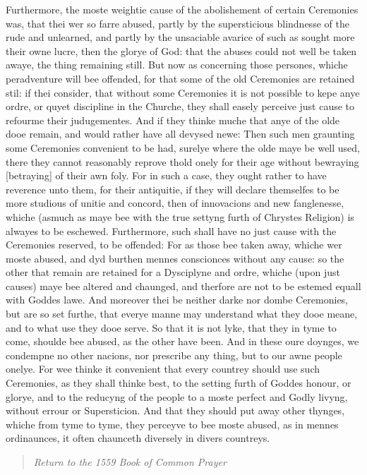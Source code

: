 Furthermore, the moste weightie cause of the abolishement
of certain Ceremonies was, that thei wer so farre abused, partly by
the supersticious blindnesse of the rude and unlearned, and partly by
the unsaciable avarice of such as sought more their owne lucre, then
the glorye of God: that the abuses could not well be taken awaye, the
thing remaining still. But now as concerning those persones, whiche
peradventure will bee offended, for that some of the old Ceremonies
are retained stil: if thei consider, that without some Ceremonies it
is not possible to kepe anye ordre, or quyet discipline in the Churche,
they shall easely perceive just cause to refourme their judugementes.
And if they thinke muche that anye of the olde dooe remain, and would
rather have all devysed newe: Then such men graunting some Ceremonies
convenient to be had, surelye where the olde maye be well used, there
they cannot reasonably reprove thold onely for their age without bewraying
[betraying] of their awn foly.
For in such a case, they ought rather to have reverence unto them, for
their antiquitie, if they will declare themselfes to be more studious
of unitie and concord, then of innovacions and new fanglenesse, whiche
(asmuch as maye bee with the true settyng furth of Chrystes Religion)
is alwayes to be eschewed. Furthermore, such shall have no just cause
with the Ceremonies reserved, to be offended: For as those bee taken
away, whiche wer moste abused, and dyd burthen mennes conscionces without
any cause: so the other that remain are retained for a Dysciplyne and
ordre, whiche (upon just causes) maye bee altered and chaunged, and
therfore are not to be estemed equall with Goddes lawe. And moreover
thei be neither darke nor dombe Ceremonies, but are so set furthe, that
everye manne may understand what they dooe meane, and to what use they
dooe serve. So that it is not lyke, that they in tyme to come, shoulde
bee abused, as the other have been. And in these oure doynges, we condempne
no other nacions, nor prescribe any thing, but to our awne people onelye.
For wee thinke it convenient that every countrey should use such Ceremonies,
as they shall thinke best, to the setting furth of Goddes honour, or
glorye, and to the reducyng of the people to a moste perfect and Godly
livyng, without errour or Supersticion. And that they should put away
other thynges, whiche from tyme to tyme, they perceyve to bee moste
abused, as in mennes ordinaunces, it often chaunceth diversely in divers
countreys.

\begin{quote}

\emph{Return to the 1559
Book of Common Prayer}

\end{quote}

